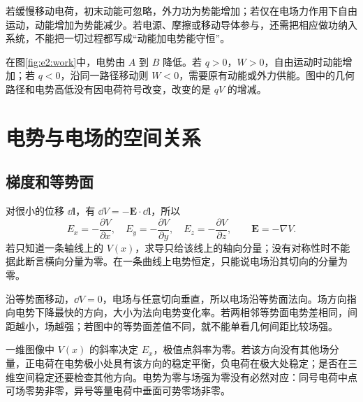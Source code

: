 若缓慢移动电荷，初末动能可忽略，外力功为势能增加；若仅在电场力作用下自由运动，动能增加为势能减少。若电源、摩擦或移动导体参与，还需把相应做功纳入系统，不能把一切过程都写成“动能加电势能守恒”。


在图\ref{fig:e2:work}中，电势由 $A$ 到 $B$ 降低。若 $q>0$，$W>0$，自由运动时动能增加；若 $q<0$，沿同一路径移动则 $W<0$，需要原有动能或外力供能。图中的几何路径和电势高低没有因电荷符号改变，改变的是 $qV$ 的增减。

\section{电势与电场的空间关系}
\subsection{梯度和等势面}

对很小的位移 $\dd\bm l$，有 $\dd V=-\bm E\cdot\dd\bm l$，所以
\[
 E_x=-\frac{\partial V}{\partial x},\quad
 E_y=-\frac{\partial V}{\partial y},\quad
 E_z=-\frac{\partial V}{\partial z},\qquad\bm E=-\nabla V.
\]
若只知道一条轴线上的 $V(x)$，求导只给该线上的轴向分量；没有对称性时不能据此断言横向分量为零。在一条曲线上电势恒定，只能说电场沿其切向的分量为零。

沿等势面移动，$\dd V=0$，电场与任意切向垂直，所以电场沿等势面法向。场方向指向电势下降最快的方向，大小为法向电势变化率。若两相邻等势面电势差相同，间距越小，场越强；若图中的等势面差值不同，就不能单看几何间距比较场强。

一维图像中 $V(x)$ 的斜率决定 $E_x$，极值点斜率为零。若该方向没有其他场分量，正电荷在电势极小处具有该方向的稳定平衡，负电荷在极大处稳定；是否在三维空间稳定还要检查其他方向。电势为零与场强为零没有必然对应：同号电荷中点可场零势非零，异号等量电荷中垂面可势零场非零。


